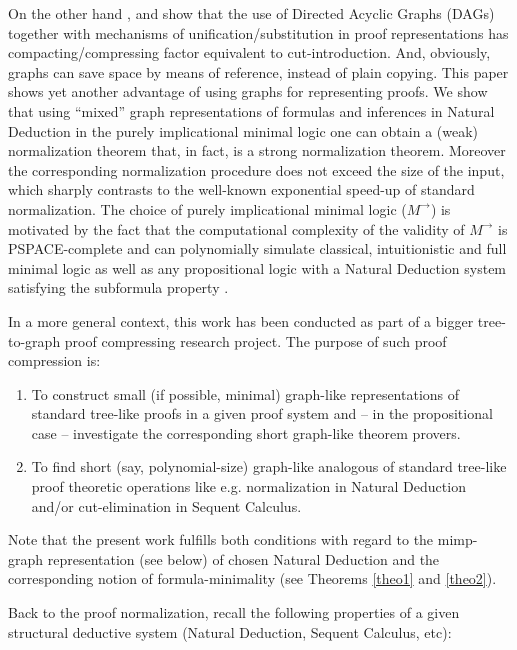 \documentclass[submission,copyright,creativecommons]{eptcs}
\begin{document}
On the other hand \cite{Finger2005}, \cite{Vaston07} and \cite{Gordeev2009}
show that the use of Directed Acyclic Graphs (DAGs) together with mechanisms
of unification/substitution in proof representations has
compacting/compressing factor equivalent to cut-introduction. And,
obviously, graphs can save space by means of reference, instead of plain
copying. This paper shows yet another advantage of using graphs for
representing proofs. We show that using ``mixed'' graph representations of
formulas and inferences in Natural Deduction in the purely implicational
minimal logic one can obtain a (weak) normalization theorem that, in fact,
is a strong normalization theorem. Moreover the corresponding normalization
procedure does not exceed the size of the input, which sharply contrasts to
the well-known exponential speed-up of standard normalization. The choice of
purely implicational minimal logic ($M^{\rightarrow }$) is motivated by the
fact that the computational complexity of the validity of $M^{\rightarrow }$
is PSPACE-complete and can polynomially simulate classical, intuitionistic
and full minimal logic \cite{Statman79} as well as any propositional
logic with a Natural Deduction system satisfying the subformula property  
\cite{Haeusler2013}.

In a more general context, this work has been conducted as part of a bigger
tree-to-graph proof compressing research project. The purpose of such proof
compression is:

\begin{enumerate}
\item  To construct small (if possible, minimal) graph-like representations
of standard tree-like proofs in a given proof system and -- in the
propositional case -- investigate the corresponding short graph-like theorem
provers.

\item  To find short (say, polynomial-size) graph-like analogous of
standard tree-like proof theoretic operations like e.g. normalization in
Natural Deduction and/or cut-elimination in Sequent Calculus.
\end{enumerate}

Note that the present work fulfills both conditions with regard to the mimp-graph
representation (see below) of chosen Natural Deduction and the corresponding
notion of formula-minimality (see Theorems \ref{theo1} and \ref{theo2}).

Back to the proof normalization, recall the following properties of a given
structural deductive system (Natural Deduction, Sequent Calculus, etc):
\end{document}
